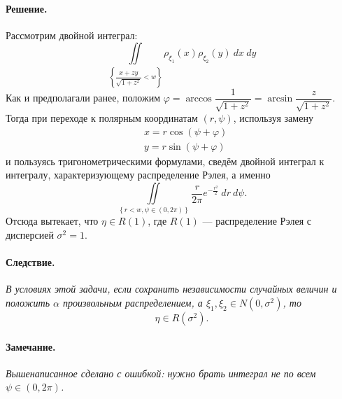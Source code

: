 \documentclass[specialist,
substylefile = spbu_report.rtx,
subf,href,colorlinks=true, 12pt]{disser}
\newenvironment{corollary}{\paragraph{Следствие.}\itshape}{\hfill}
\newenvironment{remark}{\paragraph{Замечание.}\itshape}{\hfill\\}
\newenvironment{solution}{\paragraph{Решение.}}{\hfill}
\begin{document}
\begin{solution}
		Рассмотрим двойной интеграл:
		\begin{equation*}
			\iint\limits_{\left \{\dfrac{x + zy}{\sqrt{1+z^2}}<w\right \} }\rho_{\xi_1}(x)\rho_{\xi_2}(y)~dx~dy
		\end{equation*}
		Как и предполагали ранее, положим $\varphi=\arccos\dfrac{1}{\sqrt{1+z^2}}=\arcsin\dfrac{z}{\sqrt{1+z^2}}$. Тогда при переходе к полярным координатам $(r, \psi)$, используя замену
		\begin{align*}
			&x=r\cos(\psi + \varphi)\\
			&y=r\sin(\psi + \varphi)
		\end{align*}
		и пользуясь тригонометрическими формулами, сведём двойной интеграл к интегралу, характеризующему распределение Рэлея, а именно
		\begin{equation*}
						\iint\limits_{\left \{r<w, \psi\in(0, 2\pi)\right \} }\dfrac{r}{2\pi}e^{-\frac{r^2}{2}}~dr~d\psi.
		\end{equation*}
		Отсюда вытекает, что $\eta\in R(1)$, где $R(1)$ --- распределение Рэлея с дисперсией $\sigma^2 = 1$.
		\begin{corollary}
			В условиях этой задачи, если сохранить независимости случайных величин и положить $\alpha$ произвольным распределением, а $\xi_1, \xi_2 \in N(0, \sigma^2)$, то
			\begin{equation*}
				\eta\in R(\sigma^2).
			\end{equation*}   
		\end{corollary}
		\begin{remark}
			Вышенаписанное сделано с ошибкой: нужно брать интеграл не по всем $\psi\in (0, 2\pi)$.
		\end{remark}
	\end{solution}
\end{document}

